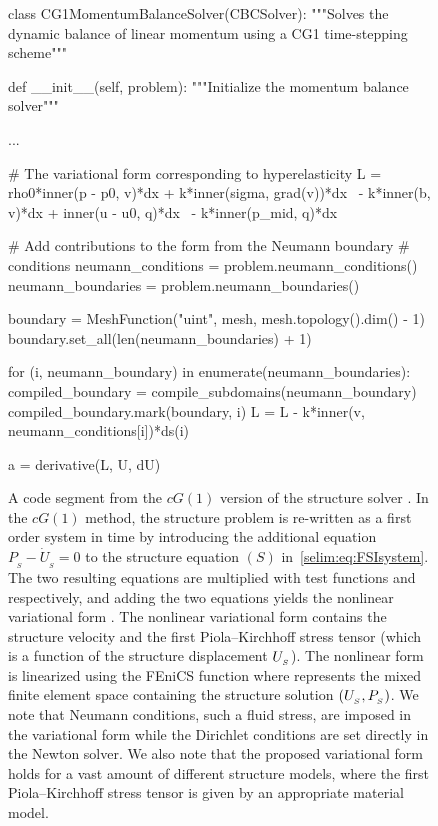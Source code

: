 \begin{figure}
\label{selim:fig:structuresolver}
\caption{A code segment from the $cG(1)$ version of the structure
  solver . In the $cG(1)$ method, the structure problem
  is re-written as a first order system in time by introducing the
  additional equation $P_{_{S}} - \dot{U}_{_{S}} = 0$ to the structure
  equation $(S)$ in~\eqref{selim:eq:FSIsystem}. The two resulting
  equations are multiplied with test functions  and 
  respectively, and adding the two equations yields the nonlinear
  variational form . The nonlinear variational form 
  contains the structure velocity  and the first
  Piola--Kirchhoff stress tensor  (which is a function of
  the structure displacement $U_{_{S}}$).  The nonlinear form  is
  linearized using the FEniCS function  where 
  represents the mixed finite element space containing the structure
  solution $(U_{_{S}}, P_{_{S}})$.  We note that Neumann conditions, such a
  fluid stress, are imposed in the variational form  while the
  Dirichlet conditions are set directly in the Newton solver. We also
  note that the proposed variational form holds for a vast amount of
  different structure models, where the first Piola--Kirchhoff stress
  tensor  is given by an appropriate material model.  }
\begin{python}
class CG1MomentumBalanceSolver(CBCSolver):
    """Solves the dynamic balance of linear momentum using a CG1
    time-stepping scheme"""

    def __init__(self, problem):
        """Initialize the momentum balance solver"""

        ...

        # The variational form corresponding to hyperelasticity
        L = rho0*inner(p - p0, v)*dx + k*inner(sigma, grad(v))*dx \
          - k*inner(b, v)*dx + inner(u - u0, q)*dx \
          - k*inner(p_mid, q)*dx

        # Add contributions to the form from the Neumann boundary
        # conditions
        neumann_conditions = problem.neumann_conditions()
        neumann_boundaries = problem.neumann_boundaries()

        boundary = MeshFunction("uint", mesh, mesh.topology().dim() - 1)
        boundary.set_all(len(neumann_boundaries) + 1)

        for (i, neumann_boundary) in enumerate(neumann_boundaries):
            compiled_boundary = compile_subdomains(neumann_boundary)
            compiled_boundary.mark(boundary, i)
            L = L - k*inner(v, neumann_conditions[i])*ds(i)

        a = derivative(L, U, dU)
\end{python}
\end{figure}

